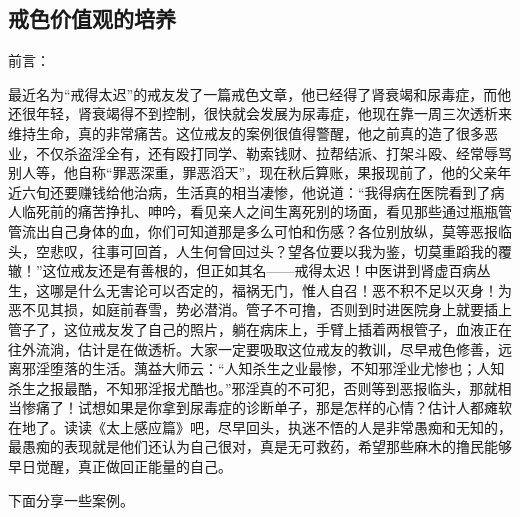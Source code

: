 \subsection{戒色价值观的培养}

前言：

最近名为“戒得太迟”的戒友发了一篇戒色文章，他已经得了肾衰竭和尿毒症，而他还很年轻，肾衰竭得不到控制，很快就会发展为尿毒症，他现在靠一周三次透析来维持生命，真的非常痛苦。这位戒友的案例很值得警醒，他之前真的造了很多恶业，不仅杀盗淫全有，还有殴打同学、勒索钱财、拉帮结派、打架斗殴、经常辱骂别人等，他自称“罪恶深重，罪恶滔天”，现在秋后算账，果报现前了，他的父亲年近六旬还要赚钱给他治病，生活真的相当凄惨，他说道：“我得病在医院看到了病人临死前的痛苦挣扎、呻吟，看见亲人之间生离死别的场面，看见那些通过瓶瓶管管流出自己身体的血，你们可知道那是多么可怕和伤感？各位别放纵，莫等恶报临头，空悲叹，往事可回首，人生何曾回过头？望各位要以我为鉴，切莫重蹈我的覆辙！”这位戒友还是有善根的，但正如其名——戒得太迟！中医讲到肾虚百病丛生，这哪是什么无害论可以否定的，福祸无门，惟人自召！恶不积不足以灭身！为恶不见其损，如庭前春雪，势必潜消。管子不可撸，否则到时进医院身上就要插上管子了，这位戒友发了自己的照片，躺在病床上，手臂上插着两根管子，血液正在往外流淌，估计是在做透析。大家一定要吸取这位戒友的教训，尽早戒色修善，远离邪淫堕落的生活。蕅益大师云：“人知杀生之业最惨，不知邪淫业尤惨也；人知杀生之报最酷，不知邪淫报尤酷也。”邪淫真的不可犯，否则等到恶报临头，那就相当惨痛了！试想如果是你拿到尿毒症的诊断单子，那是怎样的心情？估计人都瘫软在地了。读读《太上感应篇》吧，尽早回头，执迷不悟的人是非常愚痴和无知的，最愚痴的表现就是他们还认为自己很对，真是无可救药，希望那些麻木的撸民能够早日觉醒，真正做回正能量的自己。

下面分享一些案例。

